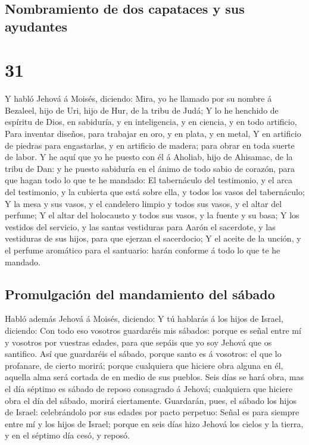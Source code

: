 \hypertarget{nombramiento-de-dos-capataces-y-sus-ayudantes}{%
\subsection{Nombramiento de dos capataces y sus
ayudantes}\label{nombramiento-de-dos-capataces-y-sus-ayudantes}}

\hypertarget{section-02-31}{%
\section{31}\label{section-02-31}}

 Y habló Jehová á Moisés, diciendo:  Mira,
yo he llamado por su nombre á Bezaleel, hijo de Uri, hijo de Hur, de la
tribu de Judá;  Y lo he henchido de espíritu de Dios, en
sabiduría, y en inteligencia, y en ciencia, y en todo artificio,
 Para inventar diseños, para trabajar en oro, y en plata,
y en metal,  Y en artificio de piedras para engastarlas, y
en artificio de madera; para obrar en toda suerte de labor.
 Y he aquí que yo he puesto con él á Aholiab, hijo de
Ahisamac, de la tribu de Dan: y he puesto sabiduría en el ánimo de todo
sabio de corazón, para que hagan todo lo que te he mandado:
 El tabernáculo del testimonio, y el arca del testimonio,
y la cubierta que está sobre ella, y todos los vasos del tabernáculo;
 Y la mesa y sus vasos, y el candelero limpio y todos sus
vasos, y el altar del perfume;  Y el altar del holocausto
y todos sus vasos, y la fuente y su basa;  Y los vestidos
del servicio, y las santas vestiduras para Aarón el sacerdote, y las
vestiduras de sus hijos, para que ejerzan el sacerdocio; 
Y el aceite de la unción, y el perfume aromático para el santuario:
harán conforme á todo lo que te he mandado.

\hypertarget{promulgaciuxf3n-del-mandamiento-del-suxe1bado}{%
\subsection{Promulgación del mandamiento del
sábado}\label{promulgaciuxf3n-del-mandamiento-del-suxe1bado}}

 Habló además Jehová á Moisés, diciendo: 
Y tú hablarás á los hijos de Israel, diciendo: Con todo eso vosotros
guardaréis mis sábados: porque es señal entre mí y vosotros por vuestras
edades, para que sepáis que yo soy Jehová que os santifico.
 Así que guardaréis el sábado, porque santo es á
vosotros: el que lo profanare, de cierto morirá; porque cualquiera que
hiciere obra alguna en él, aquella alma será cortada de en medio de sus
pueblos.  Seis días se hará obra, mas el día séptimo es
sábado de reposo consagrado á Jehová; cualquiera que hiciere obra el día
del sábado, morirá ciertamente.  Guardarán, pues, el
sábado los hijos de Israel: celebrándolo por sus edades por pacto
perpetuo:  Señal es para siempre entre mí y los hijos de
Israel; porque en seis días hizo Jehová los cielos y la tierra, y en el
séptimo día cesó, y reposó.

